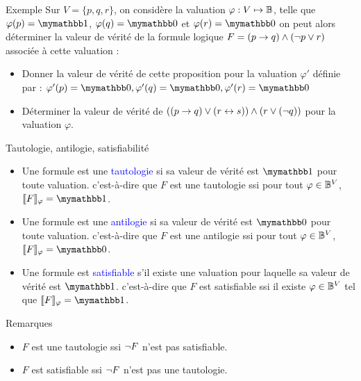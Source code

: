 \documentclass[10pt]{beamer}
\begin{document}
\begin{frame}{\Ctitle}{\stitle}
	\begin{exampleblock}{Exemple}
		Sur $V = \{p, q, r\}$, on considère la valuation $\varphi :  V  \mapsto \mathbb{B}$, telle que $\varphi(p) = \vrai$, $\varphi(q) = \faux$ et $\varphi(r) = \faux$ on peut alors déterminer la valeur de vérité de la formule logique $F = (p \to q) \wedge (\neg p \vee r )$ associée à cette valuation :
		\onslide<2->{$\vv{F} = f_{\et} (\vv{p \imp q}, \vv{\non p \ou r})$ \\}
		\onslide<3->{$\vv{F} = f_{\et} (f_{\imp}(\vv{p},\vv{q})), f_{\ou}(\vv{\non p},\vv{r})$ \\}
		\onslide<4->{$\vv{F} = f_{\et}(f_{\imp}(\vrai,\faux),f_{\ou}(\faux,\faux))$\\}
		\onslide<5->{$\vv{F} = f_{\et}(\faux,\faux)$\\}
		\onslide<6->{$\vv{F} = \faux$\\}
		\begin{itemize}
			\item<7-> Donner la valeur de vérité de cette proposition pour la valuation $\varphi'$ définie par : $ \varphi'(p) = \faux, \varphi'(q) = \faux, \varphi'(r) = \faux$
			\item<8-> Déterminer la valeur de vérité de $((p \to q) \vee (r \leftrightarrow s)) \wedge (r \vee (\neg q))$ pour la valuation $\varphi$.
		\end{itemize}
	\end{exampleblock}
\end{frame}

\begin{frame}{\Ctitle}{\stitle}
	\begin{alertblock}{Tautologie, antilogie, satisfiabilité}
		\begin{itemize}
			\item Une formule est une \textcolor{blue}{tautologie} si sa valeur de vérité est  $\vrai$ pour toute valuation. c'est-à-dire que $F$ est une tautologie ssi pour tout $\varphi \in \mathbb{B}^V$, $\vv{F} = \vrai$.
			\item<2-> Une formule est une \textcolor{blue}{antilogie} si sa valeur de vérité est  $\faux$ pour toute valuation. c'est-à-dire que $F$ est une antilogie ssi pour tout $\varphi \in \mathbb{B}^V$, $\vv{F} = \faux$.
			\item<3-> Une formule est \textcolor{blue}{satisfiable} s'il existe une valuation pour laquelle sa valeur de vérité est  $\vrai$. c'est-à-dire que $F$ est satisfiable ssi il existe $\varphi \in \mathbb{B}^V$ tel que $\vv{F} = \vrai$.
		\end{itemize}
	\end{alertblock}
	{\begin{block}{Remarques}
			\begin{itemize}
				\item<4-> $F$ est une tautologie ssi $\neg F$ n'est pas satisfiable.
				\item<5-> $F$ est satisfiable ssi $\neg F$ n'est pas une tautologie.
			\end{itemize}
		\end{block}}
\end{frame}
\end{document}

